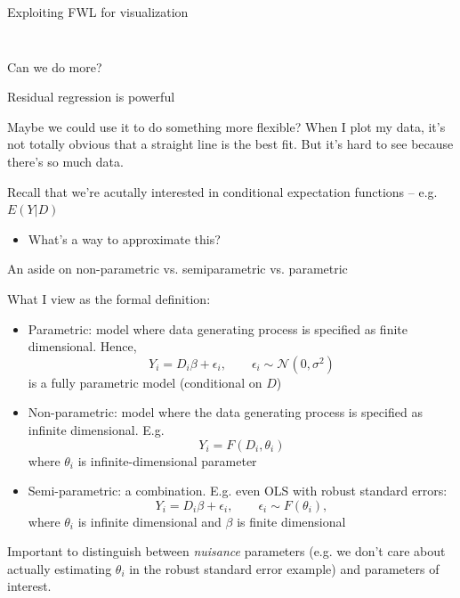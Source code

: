 \documentclass[notes,11pt, aspectratio=169]{beamer}
\newenvironment{wideitemize}{\itemize\addtolength{\itemsep}{10pt}}{\enditemize}
\begin{document}
\begin{frame}{Exploiting FWL for visualization}
\begin{columns}[T]
\begin{column}{.5\textwidth}
{      }
  \end{column}
\end{columns}
\end{frame}


\begin{frame}{Can we do more?}
  \begin{wideitemize}
  \item  Residual regression is powerful
  \item Maybe we could use it to do something more flexible?  When I
    plot my data, it's not totally obvious that a straight line is the
    best fit. But it's hard to see because there's so much data.
  \item   Recall that we're acutally interested in conditional expectation functions -- e.g. $E(Y | D )$
    \begin{itemize}
    \item   What's a way to  approximate this?
    \end{itemize}
  \end{wideitemize}
\end{frame}

\begin{frame}{An aside on non-parametric vs. semiparametric vs. parametric}
  \begin{wideitemize}
  \item What I view as the formal definition:
    \begin{itemize}
    \item Parametric: model where data generating process is specified as finite dimensional. Hence,
      $$ Y_{i} = D_{i}\beta + \epsilon_{i}, \qquad \epsilon_{i} \sim \mathcal{N}(0, \sigma^{2})$$
      is a fully parametric model (conditional on $D$)
    \item Non-parametric: model where the data generating process is specified as infinite dimensional. E.g.
      $$ Y_{i} = F(D_{i},\theta_{i})$$
      where $\theta_{i}$ is infinite-dimensional parameter
    \item Semi-parametric: a combination. E.g. even OLS with robust standard errors:
      $$ Y_{i} = D_{i}\beta + \epsilon_{i}, \qquad \epsilon_{i} \sim F(\theta_{i}),$$
      where $\theta_{i}$ is infinite dimensional and $\beta$ is finite dimensional
    \end{itemize}
  \item Important to distinguish between \emph{nuisance} parameters
    (e.g. we don't care about actually estimating $\theta_{i}$ in the
    robust standard error example) and parameters of interest. 
  \end{wideitemize}
\end{frame}
\end{document}
